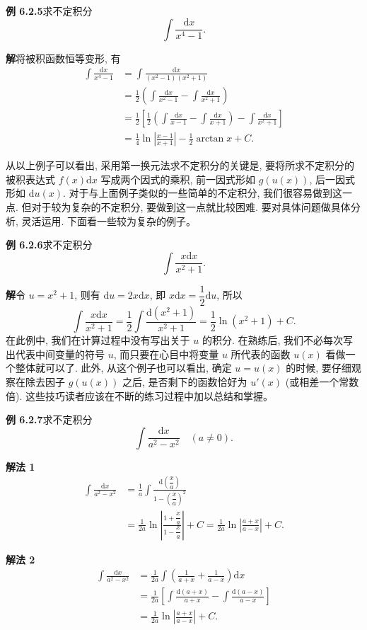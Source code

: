 \documentclass[UTF8,12pt,a4paper,fontset=fandol]{ctexart}
\begin{document}
\noindent\textbf{例 6.2.5}\quad 求不定积分
\[
  \int\frac{\mathrm dx}{x^4-1}.
\]

\noindent\textbf{解}\quad 将被积函数恒等变形, 有
\[
\begin{aligned}
  \int\frac{\mathrm dx}{x^4-1}
  &=
  \int\frac{\mathrm dx}{(x^2-1)(x^2+1)}\\
  &=
  \frac12\left(\int\frac{\mathrm dx}{x^2-1}-\int\frac{\mathrm dx}{x^2+1}\right)\\
  &=
  \frac12\left[\frac12\left(\int\frac{\mathrm dx}{x-1}-\int\frac{\mathrm dx}{x+1}\right)
  -\int\frac{\mathrm dx}{x^2+1}\right]\\
  &=
  \frac14\ln\left|\frac{x-1}{x+1}\right|-\frac12\arctan x+C.
\end{aligned}
\]

从以上例子可以看出, 采用第一换元法求不定积分的关键是, 要将所求不定积分的被积表达式 $f(x)\mathrm dx$ 写成两个因式的乘积, 前一因式形如 $g(u(x))$, 后一因式形如 $\mathrm du(x)$. 对于与上面例子类似的一些简单的不定积分, 我们很容易做到这一点. 但对于较为复杂的不定积分, 要做到这一点就比较困难. 要对具体问题做具体分析, 灵活运用. 下面看一些较为复杂的例子。

\noindent\textbf{例 6.2.6}\quad 求不定积分
\[
  \int\frac{x\mathrm dx}{x^2+1}.
\]

\noindent\textbf{解}\quad 令 $u=x^2+1$, 则有 $\mathrm du=2x\mathrm dx$, 即 $x\mathrm dx=\dfrac12\mathrm du$, 所以
\[
  \int\frac{x\mathrm dx}{x^2+1}
  =
  \frac12\int\frac{\mathrm d(x^2+1)}{x^2+1}
  =
  \frac12\ln(x^2+1)+C.
\]
在此例中, 我们在计算过程中没有写出关于 $u$ 的积分. 在熟练后, 我们不必每次写出代表中间变量的符号 $u$, 而只要在心目中将变量 $u$ 所代表的函数 $u(x)$ 看做一个整体就可以了. 此外, 从这个例子也可以看出, 确定 $u=u(x)$ 的时候, 要仔细观察在除去因子 $g(u(x))$ 之后, 是否剩下的函数恰好为 $u'(x)$ (或相差一个常数倍). 这些技巧读者应该在不断的练习过程中加以总结和掌握。

\noindent\textbf{例 6.2.7}\quad 求不定积分
\[
  \int\frac{\mathrm dx}{a^2-x^2}\quad (a\ne0).
\]

\noindent\textbf{解法 1}\quad
\[
\begin{aligned}
  \int\frac{\mathrm dx}{a^2-x^2}
  &=
  \frac1a\int\frac{\mathrm d\left(\dfrac xa\right)}{1-\left(\dfrac xa\right)^2}\\
  &=
  \frac1{2a}\ln\left|\frac{1+\dfrac xa}{1-\dfrac xa}\right|+C
  =
  \frac1{2a}\ln\left|\frac{a+x}{a-x}\right|+C.
\end{aligned}
\]

\noindent\textbf{解法 2}\quad
\[
\begin{aligned}
  \int\frac{\mathrm dx}{a^2-x^2}
  &=
  \frac1{2a}\int\left(\frac1{a+x}+\frac1{a-x}\right)\mathrm dx\\
  &=
  \frac1{2a}\left[\int\frac{\mathrm d(a+x)}{a+x}
  -\int\frac{\mathrm d(a-x)}{a-x}\right]\\
  &=
  \frac1{2a}\ln\left|\frac{a+x}{a-x}\right|+C.
\end{aligned}
\]
\end{document}
